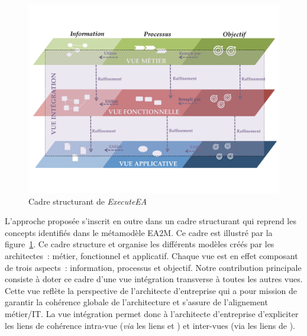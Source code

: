 \begin{figure}[!ht]
 \begin{center}
 \includegraphics[trim= 0cm 2cm 0cm 0cm, width=1\textwidth]{figures/4_demarche/vue_integration.pdf}
 \end{center}
 \caption{Cadre structurant de \protect\emph{ExecuteEA}}
 \label{fig:vue_integration}
\end{figure}

L'approche proposée s'inscrit en outre dans un cadre structurant qui reprend les concepts identifiés dans le métamodèle
EA2M. Ce cadre est illustré par la figure~\ref{fig:vue_integration}. Ce cadre structure et organise les différents modèles
créés par les architectes~: métier, fonctionnel et applicatif. Chaque vue est en effet composant de trois aspects~: information,
processus et objectif. Notre contribution principale consiste à doter ce cadre d'une vue intégration transverse à toutes les autres vues.
Cette vue reflète la perspective de l'architecte d'entreprise qui a pour mission de garantir la cohérence globale de l'architecture
et s'assure de l'alignement métier/IT. La vue intégration permet donc à l’architecte d'entreprise
d'expliciter les liens de cohérence intra-vue (\emph{via} les liens  et ) et inter-vues (via les liens de ).





